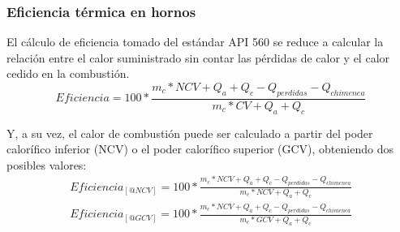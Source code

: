 \subsubsection{Eficiencia térmica en hornos}
\par El cálculo de eficiencia tomado del estándar API 560 \cite{bib:api560} se reduce a calcular la relación entre el calor suministrado sin contar las pérdidas de calor y el calor cedido en la combustión.
\begin{equation}
Eficiencia = 100 *\frac{m_c*NCV +Q_a +Q_c -Q_{perdidas} -Q_{chimenea}
}{m_c*CV +Q_a +Q_c}
\end{equation}
\par Y, a su vez, el calor de combustión puede ser calculado a partir del poder calorífico inferior (NCV) o el poder calorífico superior (GCV), obteniendo dos posibles valores:
\begin{gather}
Eficiencia_{[@NCV]} = 100 *\frac{m_c*NCV +Q_a +Q_c -Q_{perdidas}-Q_{chimenea}
}{m_c*NCV +Q_a +Q_c}\\
Eficiencia_{[@GCV]} = 100 *\frac{m_c*NCV +Q_a +Q_c -Q_{perdidas} -Q_{chimenea}
}{m_c*GCV +Q_a +Q_c}
\end{gather}